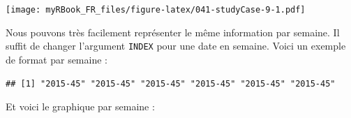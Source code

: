 \documentclass[
]{book}
\newenvironment{Shaded}{\begin{snugshade}}{\end{snugshade}}
\newcommand{\DataTypeTok}[1]{\textcolor[rgb]{0.13,0.29,0.53}{#1}}
\newcommand{\KeywordTok}[1]{\textcolor[rgb]{0.13,0.29,0.53}{\textbf{#1}}}
\newcommand{\NormalTok}[1]{#1}
\newcommand{\OperatorTok}[1]{\textcolor[rgb]{0.81,0.36,0.00}{\textbf{#1}}}
\newcommand{\StringTok}[1]{\textcolor[rgb]{0.31,0.60,0.02}{#1}}
\begin{document}
\texttt{[image: myRBook\_FR\_files/figure-latex/041-studyCase-9-1.pdf]}

Nous pouvons très facilement représenter le même information par semaine. Il suffit de changer l'argument \texttt{INDEX} pour une date en semaine. Voici un exemple de format par semaine :

\begin{Shaded}
\end{Shaded}

\begin{verbatim}
## [1] "2015-45" "2015-45" "2015-45" "2015-45" "2015-45" "2015-45"
\end{verbatim}

Et voici le graphique par semaine :
\end{document}
